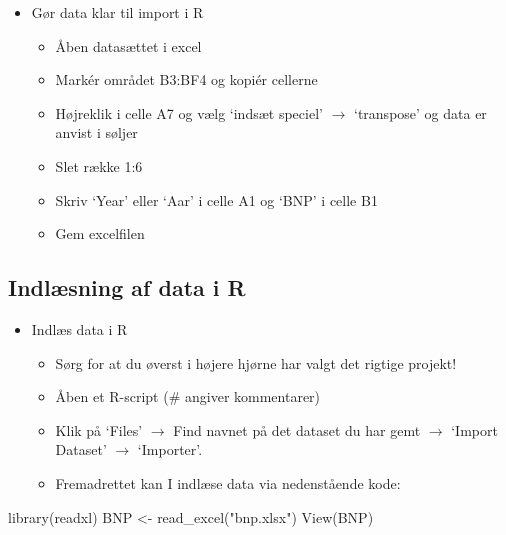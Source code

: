 \documentclass[
  12pt,
]{article}
\newenvironment{Shaded}{\begin{snugshade}}{\end{snugshade}}
\newcommand{\FunctionTok}[1]{\textcolor[rgb]{0.00,0.00,0.00}{#1}}
\newcommand{\NormalTok}[1]{#1}
\newcommand{\OtherTok}[1]{\textcolor[rgb]{0.56,0.35,0.01}{#1}}
\newcommand{\StringTok}[1]{\textcolor[rgb]{0.31,0.60,0.02}{#1}}
\providecommand{\tightlist}{%
  \setlength{\itemsep}{0pt}\setlength{\parskip}{0pt}}
\begin{document}
\begin{itemize}
\tightlist
\item
  Gør data klar til import i R

  \begin{itemize}
  \tightlist
  \item
    Åben datasættet i excel
  \item
    Markér området B3:BF4 og kopiér cellerne
  \item
    Højreklik i celle A7 og vælg `indsæt speciel' \(\rightarrow\)
    `transpose' og data er anvist i søljer
  \item
    Slet række 1:6
  \item
    Skriv `Year' eller `Aar' i celle A1 og `BNP' i celle B1
  \item
    Gem excelfilen
  \end{itemize}
\end{itemize}

\hypertarget{indluxe6sning-af-data-i-r}{%
\subsection{Indlæsning af data i R}\label{indluxe6sning-af-data-i-r}}

\begin{itemize}
\tightlist
\item
  Indlæs data i R

  \begin{itemize}
  \tightlist
  \item
    Sørg for at du øverst i højere hjørne har valgt det rigtige projekt!
  \item
    Åben et R-script (\# angiver kommentarer)
  \item
    Klik på `Files' \(\rightarrow\) Find navnet på det dataset du har
    gemt \(\rightarrow\) `Import Dataset' \(\rightarrow\) `Importer'.
  \item
    Fremadrettet kan I indlæse data via nedenstående kode:
  \end{itemize}
\end{itemize}

\begin{Shaded}
\begin{Highlighting}[]
\FunctionTok{library}\NormalTok{(readxl)}
\NormalTok{BNP }\OtherTok{\textless{}{-}} \FunctionTok{read\_excel}\NormalTok{(}\StringTok{"bnp.xlsx"}\NormalTok{)}
\FunctionTok{View}\NormalTok{(BNP) }
\end{Highlighting}
\end{Shaded}
\end{document}
